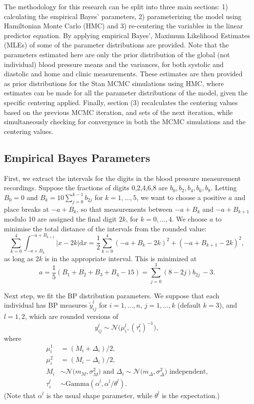\documentclass[
]{article}
\begin{document}
The methodology for this research can be split into three main sections: 1) calculating the empirical Bayes' parameters, 2) parameterizing the model using Hamiltonian Monte Carlo (HMC) and 3) re-centering the variables in the linear predictor equation. By applying empirical Bayes', Maximum Likelihood Estimates (MLEs) of some of the parameter distributions are provided. Note that the parameters estimated here are only the prior distribution of the global (not individual) blood pressure means and the variances, for both systolic and diastolic and home and clinic measurements. These estimates are then provided as prior distributions for the Stan MCMC simulations using HMC, where estimates can be made for all the parameter distributions of the model, given the specific centering applied. Finally, section (3) recalculates the centering values based on the previous MCMC iteration, and sets of the next iteration, while simultaneously checking for convergence in both the MCMC simulations and the centering values.

\subsection{Empirical Bayes Parameters}\label{empirical-bayes-parameters}

First, we extract the intervals for the digits in the blood pressure measurement recordings. Suppose the fractions of digits 0,2,4,6,8 are \(b_0,b_2,b_4,b_6,b_8\).
Letting \(B_0=0\) and \(B_k=10\sum_{j=0}^{k-1}b_{2j}\) for \(k=1,\dots,5\),
we want to choose a positive \(a\) and place breaks at \(-a+B_k\), so that measurements between \(-a+B_k\) and \(-a+B_{k+1}\) modulo
10 are assigned the final digit \(2k\), for \(k=0,\dots,4\).
We choose \(a\) to minimise the total distance of the intervals from the rounded value:
\[
  \sum_{k=0}^4 \int_{-a+B_k}^{-a+B_{k+1}} \bigl| x-2k\bigr|\mathrm{d} x=\frac12\sum_{k=0}^4 \left(-a+B_k-2k\right)^2 + \left(-a+B_{k+1}-2k\right)^2,
\]
as long as \(2k\) is in the appropriate interval. This is minimized at
\[
  a= \frac{1}{5}\left(B_1+B_2+B_3+B_4 - 15\right)=\sum_{j=0}^3 (8-2j) b_{2j} \, - 3.
\]

Next step, we fit the BP distribution parameters. We suppose that each individual has BP measures
\(\tilde{y}_{ij}^l\) for \(i=1,\dots,n\), \(j=1,\dots,k\) (default \(k=3\)),
and \(l=1,2\), which are rounded versions of
\[
  y_{ij}^l \sim \mathcal{N}\bigl( \mu_i^l,(\tau_i^l)^{-1}\bigr),
\]
where
\begin{align*}
\mu_i^1&=(M_i+\Delta_i)/2,\\
\mu_i^2&=(M_i-\Delta_i)/2,\\
M_i&\sim \mathcal{N}\bigl(m_M,\sigma^2_M) \text{ and }
  \Delta_i\sim \mathcal{N}\bigl(m_\Delta,\sigma^2_\Delta) \text{ independent,}\\
  \tau_i^l &\sim \mathrm{Gamma}(\alpha^l,\alpha^l/\theta^l ).
\end{align*}
(Note that \(\alpha^l\) is the usual shape parameter,
while \(\theta^l\) is the expectation.)
\end{document}
